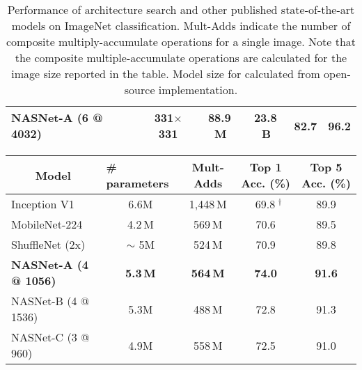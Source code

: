 \documentclass[10pt,twocolumn,letterpaper]{article}
\begin{document}
\begin{table*}[h!]
\begin{tabular}{lc|cc|cc}
\textbf{NASNet-A (6 @ 4032)} & \textbf{331$\times$331} & \textbf{88.9\,M} & \textbf{23.8\,B} & \textbf{82.7} & \textbf{96.2} \\
\bottomrule
\end{tabular}

\vspace{0.2cm}
\caption{Performance of architecture search and other published state-of-the-art models on ImageNet classification. Mult-Adds indicate the number of composite multiply-accumulate operations for a single image. Note that the composite multiple-accumulate operations are calculated for the image size reported in the table. Model size for \cite{hu2017squeeze} calculated from open-source implementation.}
\label{tab:imagenet}
\end{table*}\begin{table*}[h!]
\centering
\small
\begin{tabular}{l|cc|cc}
\toprule
\multicolumn{1}{c|}{\bf Model} & \multicolumn{1}{l}{\bf \# parameters} & \bf Mult-Adds & \bf Top 1 Acc. (\%) & \bf Top 5 Acc. (\%)  \\ \midrule
Inception V1~\cite{szegedy2015going} & 6.6M & 1,448\,M & $\;\;$69.8$\;^{\dagger}$ & 89.9 \\
MobileNet-224 \cite{howard2017mobilenets} & 4.2\,M & 569\,M & 70.6 & 89.5  \\
ShuffleNet (2x) \cite{shufflenet} & $\sim$ 5M & 524\,M & 70.9 & 89.8 \\
\midrule
\textbf{NASNet-A (4 @ 1056)} & \textbf{5.3\,M} & \textbf{564\,M} & \textbf{74.0} & \textbf{91.6} \\
NASNet-B (4 @ 1536) & 5.3M & 488\,M & 72.8 & 91.3  \\
NASNet-C (3 @ 960) & 4.9M & 558\,M & 72.5 & 91.0  \\
\bottomrule
\end{tabular}


\end{table*}
\end{document}
